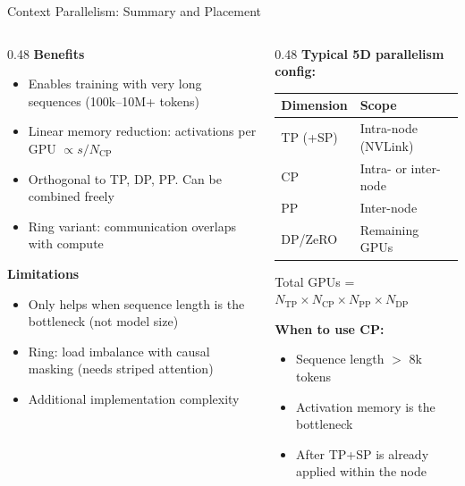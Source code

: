 \begin{frame}{Context Parallelism: Summary and Placement}

  \begin{columns}
    \begin{column}{0.48\textwidth}
      \textbf{Benefits}
      \begin{itemize}
        \item Enables training with very long sequences (100k--10M+ tokens)
        \item Linear memory reduction: activations per GPU $\propto s / N_{\text{CP}}$
        \item Orthogonal to TP, DP, PP. Can be combined freely
        \item Ring variant: communication overlaps with compute
      \end{itemize}

      \vspace{0.3em}
      \textbf{Limitations}
      \begin{itemize}
        \item Only helps when sequence length is the bottleneck (not model size)
        \item Ring: load imbalance with causal masking (needs striped attention)
        \item Additional implementation complexity
      \end{itemize}
    \end{column}
    \begin{column}{0.48\textwidth}
      \textbf{Typical 5D parallelism config:}

      \vspace{0.3em}
      {\small
      \begin{tabular}{l l}
        \toprule
        \textbf{Dimension} & \textbf{Scope} \\
        \midrule
        TP (+SP) & Intra-node (NVLink) \\
        CP       & Intra- or inter-node \\
        PP       & Inter-node \\
        DP/ZeRO  & Remaining GPUs \\
        \bottomrule
      \end{tabular}

      \vspace{0.3em}
      Total GPUs = $N_\text{TP} \times N_\text{CP} \times N_\text{PP} \times N_\text{DP}$
      }

      \vspace{0.5em}
      \textbf{When to use CP:}
      \begin{itemize}
        \item Sequence length $>$ 8k tokens
        \item Activation memory is the bottleneck
        \item After TP+SP is already applied within the node
      \end{itemize}
    \end{column}
  \end{columns}
\end{frame}

